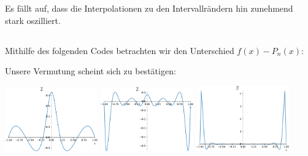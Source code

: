 Es fällt auf, dass die Interpolationen zu den Intervallrändern hin zunehmend stark oszilliert.



\subsection{}

Mithilfe des folgenden Codes betrachten wir den Unterschied $f(x) - P_n(x)$:



Unsere Vermutung scheint sich zu bestätigen:

\begin{center}
  \includegraphics[width = 0.3\textwidth]{chapter_09/exercise_09_47_figure_4.pdf}
  \hspace{1em}
  \includegraphics[width = 0.3\textwidth]{chapter_09/exercise_09_47_figure_5.pdf}
  \hspace{1em}
  \includegraphics[width = 0.3\textwidth]{chapter_09/exercise_09_47_figure_6.pdf}
\end{center}
